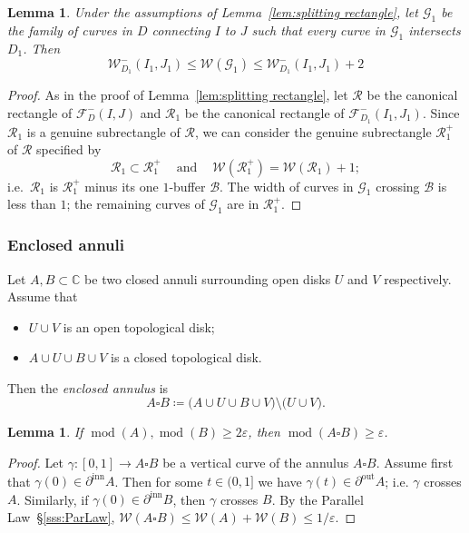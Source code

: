 \documentclass{amsart}
\renewcommand{\sp}{{\ \ }}
\newcommand{\1}{{\mathbb 1 }}
\newcommand{\FamG}{{\mathcal G}}
\newcommand{\Fam}{{\mathcal F}}
\newcommand{\Width}{{\mathcal W}}
\newcommand\RR{\mathcal{R}}
\newcommand\inn{{\operatorname{inn}}}
\newcommand\BB{\mathcal{B}}
\newcommand\out{{\operatorname{out}}}
\newcommand{\C}{\mathbb{C}}
\newtheorem{lem}[thm]{Lemma}
\theoremstyle{remark}
\numberwithin{equation}{section}
\theoremstyle{definition}
\renewcommand{\mod}{\operatorname{mod}}
\begin{document}
\begin{lem}
\label{lem:splitting rectangle:2} Under the assumptions of Lemma~\ref{lem:splitting rectangle}, let $\FamG_1$ be the family of curves in $D$ connecting $I$ to $J$ such that every curve in $\FamG_1$ intersects $D_1$. Then 
\[\Width^-_{D_1}(I_1,J_1) \le \Width(\FamG_1)\le \Width^-_{D_1}(I_1,J_1)+2\]
\end{lem}
\begin{proof}
As in the proof of Lemma~\ref{lem:splitting rectangle}, let $\RR$ be the canonical rectangle of $\Fam^-_D(I,J)$ and $\RR_1$ be the canonical rectangle of $\Fam^-_{D_1}(I_1,J_1)$. Since $\RR_1$ is a genuine subrectangle of $\RR$, we can consider the genuine subrectangle $\RR_1^{+}$ of $\RR$ specified by \[\RR_1\subset \RR_1^+ \sp\sp\text{ and }\sp\sp\Width(\RR^+_1)= \Width(\RR_1)+1;\]
i.e.~$\RR_1$ is $\RR_1^+$ minus its one $1$-buffer $\BB$. The width of curves in $\FamG_1$ crossing $\BB$ is less than $1$; the remaining curves of $\FamG_1$ are in $\RR_1^+$.
\end{proof}









\subsubsection{Enclosed annuli}
\label{sss:EnclAnn} Let $A, B\subset \C$ be two closed annuli surrounding open disks $U$ and $V$ respectively. Assume that 
\begin{itemize}
\item $U \cup V$ is an open topological disk;
\item $A\cup U\cup B\cup V$ is a closed topological disk. 
\end{itemize}
Then the \emph{enclosed annulus} is
\[A\square B\coloneqq \big(A\cup U\cup B\cup V \big)\setminus  \big(U \cup V\big).\]
\begin{lem} 
\label{lem:square}
If $\mod (A), \mod (B)\ge 2\varepsilon$, then $\mod (A\square B) \ge \varepsilon$.
\end{lem}
\begin{proof}
Let $\gamma\colon [0,1] \to A\square B$ be a vertical curve of the annulus $A\square B$. Assume first that $\gamma(0)\in \partial^\inn A$. Then for some $t\in (0,1]$ we have
$\gamma(t)\in \partial^\out A$; i.e. $\gamma$ crosses $A$. Similarly, if $\gamma(0)\in\partial ^\inn B$, then $\gamma$ crosses $B$. By the Parallel Law~\S\ref{sss:ParLaw}, $\Width(A\square B)\le \Width(A)+\Width(B)\le 1/\varepsilon$.
\end{proof}
\end{document}
